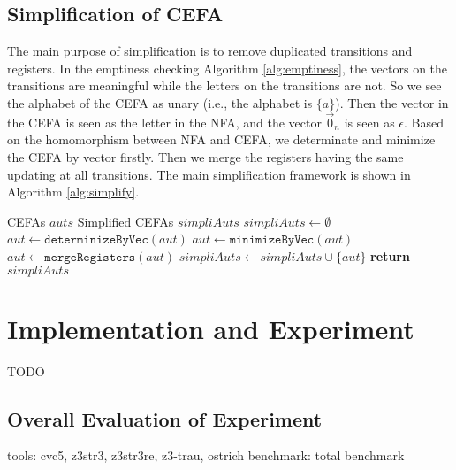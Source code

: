 \documentclass[runningheads]{llncs}
\newcommand*{\myvec}[1]{\vec{#1}}
\newcommand*{\algfun}[1]{\texttt{#1}}
\begin{document}
\subsection{Simplification of CEFA}
The main purpose of simplification is to remove duplicated transitions and registers. In the emptiness checking Algorithm \ref{alg:emptiness}, the vectors on the transitions are meaningful while the letters on the transitions are not. So we see the alphabet of the CEFA as unary (i.e., the alphabet is $\{a\}$). Then the vector in the CEFA is seen as the letter in the NFA, and the vector $\myvec{0}_n$ is seen as $\epsilon$. Based on the homomorphism between NFA and CEFA, we determinate and minimize \cite{aut_hopcraft} the CEFA by vector firstly. Then we merge the registers having the same updating at all transitions. The main simplification framework is shown in Algorithm \ref{alg:simplify}. 
\begin{algorithm}
  \caption{$\algfun{simplify}(auts)$}
  \label{alg:simplify}
  \begin{algorithmic}[1]
    \Require CEFAs $auts$
    \Ensure Simplified CEFAs $simpliAuts$
    \Statex
    \State $simpliAuts \gets \emptyset$
      \State $aut \gets \algfun{determinizeByVec}(aut)$
      \State $aut \gets \algfun{minimizeByVec}(aut)$
      \State $aut \gets \algfun{mergeRegisters}(aut)$
      \State $simpliAuts \gets simpliAuts \cup \{aut\}$
    \EndFor
    \State \textbf{return} $simpliAuts$
  \end{algorithmic}
\end{algorithm}


\section{Implementation and Experiment} \label{sec:imp}
TODO
\subsection{Overall Evaluation of Experiment}
tools: cvc5, z3str3, z3str3re, z3-trau, ostrich
benchmark: total benchmark
\end{document}
